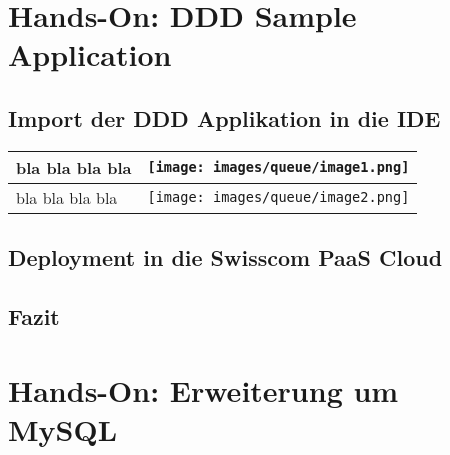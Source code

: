 \chapter{Hands-On: DDD Sample Application}
\section{Import der DDD Applikation in die IDE}
\begin{longtable}{| p{5cm} | p{11cm} |}
\hline
bla bla bla bla
&\texttt{[image: images/queue/image1.png]}
 \\ \hline
bla bla bla bla
&\texttt{[image: images/queue/image2.png]}
 \\ \hline
\end{longtable}

\section{Deployment in die Swisscom PaaS Cloud}

\section{Fazit}





\chapter{Hands-On: Erweiterung um MySQL}
